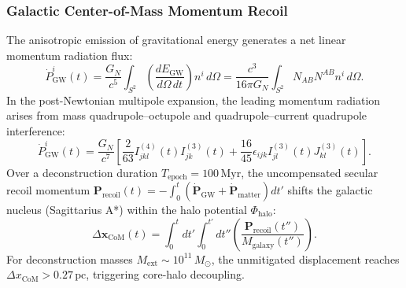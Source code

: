 \documentclass[11pt,onecolumn]{article}
\begin{document}
\subsubsection{Galactic Center-of-Mass Momentum Recoil}
The anisotropic emission of gravitational energy generates a net linear momentum radiation flux:
\begin{equation}
    \dot{P}_{\text{GW}}^i(t) = \frac{G_N}{c^5} \int_{S^2} \left( \frac{dE_{\text{GW}}}{d\Omega\,dt} \right) n^i\,d\Omega = \frac{c^3}{16\pi G_N} \int_{S^2} N_{AB} N^{AB} n^i\,d\Omega.
    \label{eq:gw_momentum_flux}
\end{equation}
In the post-Newtonian multipole expansion, the leading momentum radiation arises from mass quadrupole--octupole and quadrupole--current quadrupole interference:
\begin{equation}
    \dot{P}_{\text{GW}}^i(t) = \frac{G_N}{c^7} \left[ \frac{2}{63} I_{jkl}^{(4)}(t) I_{jk}^{(3)}(t) + \frac{16}{45} \epsilon_{ijk} I_{jl}^{(3)}(t) J_{kl}^{(3)}(t) \right].
\end{equation}
Over a deconstruction duration $T_{\text{epoch}} = 100\,\text{Myr}$, the uncompensated secular recoil momentum $\mathbf{P}_{\text{recoil}}(t) = -\int_0^t (\dot{\mathbf{P}}_{\text{GW}} + \dot{\mathbf{P}}_{\text{matter}}) dt'$ shifts the galactic nucleus (Sagittarius A*) within the halo potential $\Phi_{\text{halo}}$:
\begin{equation}
    \Delta \mathbf{x}_{\text{CoM}}(t) = \int_0^t dt' \int_0^{t'} dt'' \left( \frac{\mathbf{P}_{\text{recoil}}(t'')}{M_{\text{galaxy}}(t'')} \right).
\end{equation}
For deconstruction masses $M_{\text{ext}} \sim 10^{11}\,M_\odot$, the unmitigated displacement reaches $\Delta x_{\text{CoM}} > 0.27\,\text{pc}$, triggering core-halo decoupling.
\end{document}
